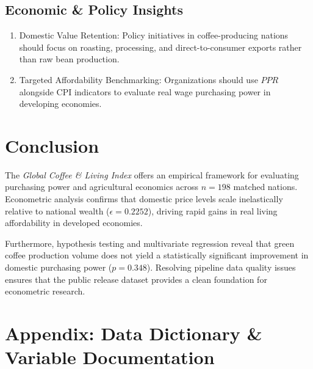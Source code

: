 \documentclass[11pt,a4paper]{article}
\begin{document}
\subsection{Economic \& Policy Insights}
\begin{enumerate}[leftmargin=1.5em]
    \item Domestic Value Retention: Policy initiatives in coffee-producing nations should focus on roasting, processing, and direct-to-consumer exports rather than raw bean production.
    \item Targeted Affordability Benchmarking: Organizations should use $PPR$ alongside CPI indicators to evaluate real wage purchasing power in developing economies.
\end{enumerate}


\section{Conclusion}


The \emph{Global Coffee \& Living Index} offers an empirical framework for evaluating purchasing power and agricultural economics across $n=198$ matched nations. Econometric analysis confirms that domestic price levels scale inelastically relative to national wealth ($\epsilon = 0.2252$), driving rapid gains in real living affordability in developed economies. 

Furthermore, hypothesis testing and multivariate regression reveal that green coffee production volume does not yield a statistically significant improvement in domestic purchasing power ($p = 0.348$). Resolving pipeline data quality issues ensures that the public release dataset provides a clean foundation for econometric research.

\newpage
\appendix
\section*{Appendix: Data Dictionary \& Variable Documentation}
\end{document}
